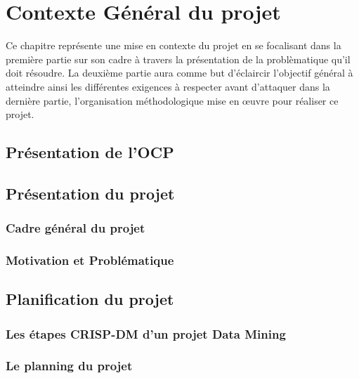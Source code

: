 \chapter{Contexte Général du projet}

Ce chapitre représente une mise en contexte du projet en se focalisant dans la première partie sur son cadre à travers la présentation de la problèmatique qu'il doit résoudre. La deuxième partie aura comme but d'éclaircir l'objectif général à atteindre ainsi les différentes exigences à respecter avant d'attaquer dans la dernière partie, l'organisation méthodologique mise en œuvre pour réaliser ce projet.

\section{Présentation de l’OCP}

	
\section{Présentation du projet}
	\subsection{Cadre général du projet}
	\subsection{Motivation et Problématique}


\section{Planification du projet}
	\subsection{Les étapes CRISP-DM d'un projet Data Mining}
	\subsection{Le planning du projet}
